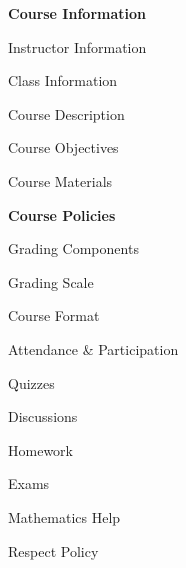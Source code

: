 \documentclass[11pt,letterpaper]{article}
\begin{document}
\mytitle




\begin{minipage}[t]{0.45\textwidth}
{\bfseries\color{stacred} Course Information} \dotfill \pageref{course_info} \par
\hspace{0.3cm} Instructor Information \dotfill \pageref{instr_info} \par
\hspace{0.3cm} Class Information \dotfill \pageref{class_info} \par
\hspace{0.3cm} Course Description \dotfill \pageref{course_desc} \par
\hspace{0.3cm} Course Objectives \dotfill \pageref{course_obj} \par
\hspace{0.3cm} Course Materials \dotfill \pageref{course_mat} \par
{\bfseries\color{stacred} Course Policies} \dotfill \pageref{course_polc} \par
\hspace{0.3cm} Grading Components \dotfill \pageref{grade_comp} \par
\hspace{0.3cm} Grading Scale \dotfill \pageref{grade_scale} \par
\hspace{0.3cm} Course Format \dotfill \pageref{course_form} \par
\hspace{0.3cm} Attendance \& Participation \dotfill \pageref{attend} \par
\hspace{0.3cm} Quizzes \dotfill \pageref{quiz} \par
\hspace{0.3cm} Discussions \dotfill \pageref{discussions} \par
\hspace{0.3cm} Homework \dotfill \pageref{hw} \par
\hspace{0.3cm} Exams \dotfill \pageref{exams} \par
\hspace{0.3cm} Mathematics Help \dotfill \pageref{help} \par
\hspace{0.3cm} Respect Policy \dotfill \pageref{respect} \par

\end{minipage}
\end{document}
